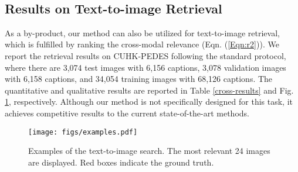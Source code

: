 \documentclass[runningheads]{llncs}
\begin{document}
\begin{table}[t]
   \begin{minipage}{0.75\textwidth}
\end{minipage}
 ~\hfill~
\begin{minipage}{0.22\textwidth}
    \label{cross-results}
\end{minipage} 
\vspace{-1em}
\end{table}

 

 
\subsection{Results on Text-to-image Retrieval}

As a by-product, our method can also be utilized for text-to-image retrieval, which is fulfilled by ranking the cross-modal relevance (Eqn. (\ref{Eqn:r2})). We report the retrieval results on CUHK-PEDES following the standard protocol, where there are 3,074 test images with 6,156 captions, 3,078 validation images with 6,158 captions, and 34,054 training images with 68,126 captions. The quantitative and qualitative results are reported in Table \ref{cross-results} and Fig. \ref{fig:text-to-image-figure}, respectively. Although our method is not specifically designed for this task, it achieves competitive results to the current state-of-the-art methods. 

\begin{figure}[t]
 \begin{center}
\texttt{[image: figs/examples.pdf]}  \vspace{-1em} 
 \caption{Examples of the text-to-image search. The most relevant 24 images are displayed. Red boxes indicate the ground truth.}\label{fig:text-to-image-figure} 
 \end{center}\vspace{-2em}
\end{figure}
\end{document}
